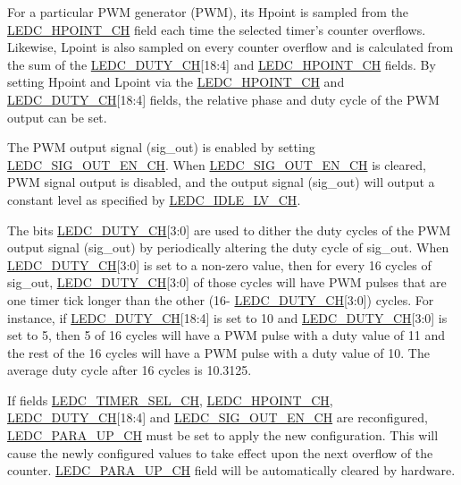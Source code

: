 \documentclass[main\_\_EN.tex]{subfiles}
\begin{document}
For a particular PWM generator (PWM), its Hpoint is sampled from the \hyperref[fielddesc:LEDCHPOINTCHN]{LEDC\_HPOINT\_CH} field each time the selected timer's counter overflows. Likewise, Lpoint is also sampled on every counter overflow and is calculated from the sum of the \hyperref[fielddesc:LEDCDUTYCHN]{LEDC\_DUTY\_CH}[18:4] and \hyperref[fielddesc:LEDCHPOINTCHN]{LEDC\_HPOINT\_CH} fields. By setting Hpoint and Lpoint via the \hyperref[fielddesc:LEDCHPOINTCHN]{LEDC\_HPOINT\_CH} and \hyperref[fielddesc:LEDCDUTYCHN]{LEDC\_DUTY\_CH}[18:4] fields, the relative phase and duty cycle of the PWM output can be set.


The PWM output signal (sig\_out) is enabled by setting \hyperref[fielddesc:LEDCSIGOUTENCHN]{LEDC\_SIG\_OUT\_EN\_CH}. When \hyperref[fielddesc:LEDCSIGOUTENCHN]{LEDC\_SIG\_OUT\_EN\_CH} is cleared, PWM signal output is disabled, and the output signal (sig\_out) will output a constant level as specified by \hyperref[fielddesc:LEDCIDLELVCHN]{LEDC\_IDLE\_LV\_CH}.

The bits \hyperref[fielddesc:LEDCDUTYCHN]{LEDC\_DUTY\_CH}[3:0] are used to dither the duty cycles of the PWM output signal (sig\_out) by periodically altering the duty cycle of sig\_out. When \hyperref[fielddesc:LEDCDUTYCHN]{LEDC\_DUTY\_CH}[3:0] is set to a non-zero value, then for every 16 cycles of sig\_out, \hyperref[fielddesc:LEDCDUTYCHN]{LEDC\_DUTY\_CH}[3:0] of those cycles will have PWM pulses that are one timer tick longer than the other (16- \hyperref[fielddesc:LEDCDUTYCHN]{LEDC\_DUTY\_CH}[3:0]) cycles. For instance, if \hyperref[fielddesc:LEDCDUTYCHN]{LEDC\_DUTY\_CH}[18:4] is set to 10 and \hyperref[fielddesc:LEDCDUTYCHN]{LEDC\_DUTY\_CH}[3:0] is set to 5, then 5 of 16 cycles will have a PWM pulse with a duty value of 11 and the rest of the 16 cycles will have a PWM pulse with a duty value of 10. The average duty cycle after 16 cycles is 10.3125.

If fields \hyperref[fielddesc:LEDCTIMERSELCHN]{LEDC\_TIMER\_SEL\_CH},
\hyperref[fielddesc:LEDCHPOINTCHN]{LEDC\_HPOINT\_CH}, \hyperref[fielddesc:LEDCDUTYCHN]{LEDC\_DUTY\_CH}[18:4] and  \hyperref[fielddesc:LEDCSIGOUTENCHN]{LEDC\_SIG\_OUT\_EN\_CH} are reconfigured, \hyperref[fielddesc:LEDCPARAUPCHN]{LEDC\_PARA\_UP\_CH} must be set to apply the new configuration. This will cause the newly configured values to take effect upon the next overflow of the counter. \hyperref[fielddesc:LEDCPARAUPCHN]{LEDC\_PARA\_UP\_CH} field will be automatically cleared by hardware.
\end{document}
